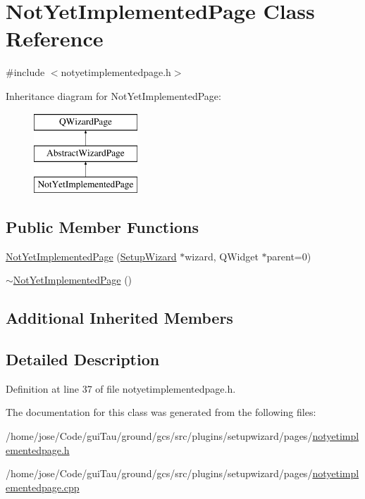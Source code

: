 \hypertarget{class_not_yet_implemented_page}{\section{Not\-Yet\-Implemented\-Page Class Reference}
\label{class_not_yet_implemented_page}
}


{\ttfamily \#include $<$notyetimplementedpage.\-h$>$}

Inheritance diagram for Not\-Yet\-Implemented\-Page\-:\begin{figure}[H]
\begin{center}
\leavevmode
\includegraphics[height=3.000000cm]{class_not_yet_implemented_page}
\end{center}
\end{figure}
\subsection*{Public Member Functions}
\begin{DoxyCompactItemize}
\item 
\hyperlink{group___not_yet_implemented_page_ga2d16a7a61f866fb399f6e888957a8fdc}{Not\-Yet\-Implemented\-Page} (\hyperlink{class_setup_wizard}{Setup\-Wizard} $\ast$wizard, Q\-Widget $\ast$parent=0)
\item 
\hyperlink{group___not_yet_implemented_page_gaddca330fa063b9b729adc5f9eb7f3eeb}{$\sim$\-Not\-Yet\-Implemented\-Page} ()
\end{DoxyCompactItemize}
\subsection*{Additional Inherited Members}


\subsection{Detailed Description}


Definition at line 37 of file notyetimplementedpage.\-h.



The documentation for this class was generated from the following files\-:\begin{DoxyCompactItemize}
\item 
/home/jose/\-Code/gui\-Tau/ground/gcs/src/plugins/setupwizard/pages/\hyperlink{notyetimplementedpage_8h}{notyetimplementedpage.\-h}\item 
/home/jose/\-Code/gui\-Tau/ground/gcs/src/plugins/setupwizard/pages/\hyperlink{notyetimplementedpage_8cpp}{notyetimplementedpage.\-cpp}\end{DoxyCompactItemize}
